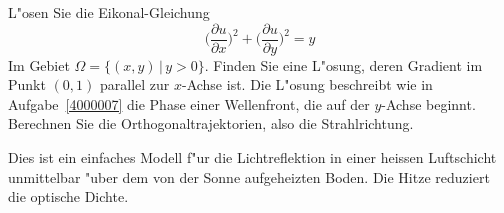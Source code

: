 L"osen Sie die Eikonal-Gleichung
\begin{equation}
\biggl( \frac{\partial u}{\partial x} \biggr)^2
+
\biggl( \frac{\partial u}{\partial y} \biggr)^2
=
y
\label{4000008:eikonal}
\end{equation}
Im Gebiet $\Omega=\{(x,y)\,|\, y > 0\}$.
Finden Sie eine L"osung, deren Gradient im Punkt $(0,1)$ parallel
zur $x$-Achse ist.
Die L"osung beschreibt wie in Aufgabe~\ref{4000007} die
Phase einer Wellenfront, die auf der $y$-Achse beginnt.
Berechnen Sie die Orthogonaltrajektorien, also die Strahlrichtung.

\begin{hinweis}
Dies ist ein einfaches Modell f"ur die Lichtreflektion in einer
heissen Luftschicht unmittelbar "uber dem von der Sonne aufgeheizten
Boden. Die Hitze reduziert die optische Dichte.
\end{hinweis}

